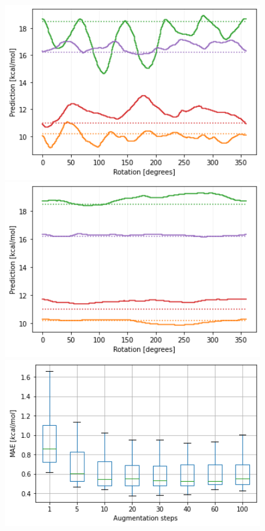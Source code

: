 \begin{figure}[!htb]
    \includegraphics[width=1.0\textwidth]{figures/regression/snap/aug-5steps-30per.png}
  \endminipage\hfill
  \includegraphics[width=1.0\textwidth]{figures/regression/snap/aug-30steps-30per.png}
  \endminipage\hfill  
    \includegraphics[width=1.0\textwidth]{figures/regression/snap/augmentation.png}

\end{figure}
